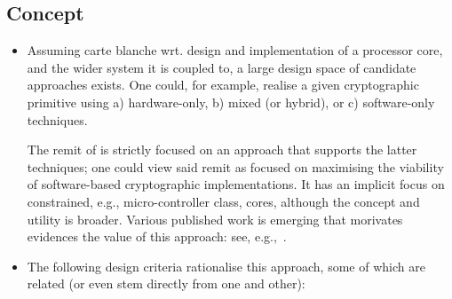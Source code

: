 
\subsection{Concept}
\label{sec:bg:concept}

\begin{itemize}

\item Assuming carte blanche wrt. design and implementation of a processor 
      core, and the wider system it is coupled to, a large design space of 
      candidate approaches exists.  One could, for example, realise a given 
      cryptographic primitive using
      a) hardware-only,
      b) mixed (or hybrid),
         or
      c) software-only
      techniques.

      The remit of \XCID is strictly focused on an approach that supports the
      latter techniques; one could view said remit as focused on maximising
      the viability of software-based cryptographic implementations.  It has
      an implicit focus on constrained, e.g., micro-controller class, cores, 
      although the concept and utility is broader.
      Various published work is emerging that morivates evidences the value 
      of this approach: 
      see, e.g.,~\cite{SCARV:Stoffelen:19}.

\item The following design criteria rationalise this approach, some of which
      are related (or even stem directly from one and other):


\end{itemize}
